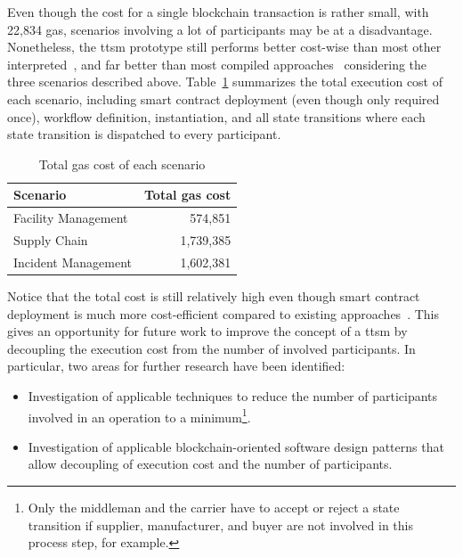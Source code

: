 Even though the cost for a single blockchain transaction is rather small, with 22,834 gas, scenarios involving a lot of participants may be at a disadvantage. Nonetheless, the \gls{ttsm} prototype still performs better cost-wise than most other interpreted~\cite{interpreted_bp_on_blockchain_loukil,interpreted_bp_on_blockchain_weber}, and far better than most compiled approaches~\cite{untrusted_bp_execution_using_blockchain,optimized_execution_of_bp_using_petri_nets_on_blockchain} considering the three scenarios described above. Table~\ref{tab:evaluation:simulations:gas_cost_total} summarizes the total execution cost of each scenario, including smart contract deployment (even though only required once), workflow definition, instantiation, and all state transitions where each state transition is dispatched to every participant.

\begin{table}[h]
\centering
\begin{tabular}{|l|r|}
    \hline
    \textbf{Scenario} & \textbf{Total gas cost} \\
    \hline
    Facility Management & 574,851 \\
    Supply Chain        & 1,739,385 \\
    Incident Management & 1,602,381 \\
    \hline
\end{tabular}
\caption{Total gas cost of each scenario}
\label{tab:evaluation:simulations:gas_cost_total}
\end{table}

Notice that the total cost is still relatively high even though smart contract deployment is much more cost-efficient compared to existing approaches~\cite{interpreted_bp_on_blockchain_loukil,interpreted_bp_on_blockchain_weber}. This gives an opportunity for future work to improve the concept of a \gls{ttsm} by decoupling the execution cost from the number of involved participants. In particular, two areas for further research have been identified:

\begin{itemize}
    \item Investigation of applicable techniques to reduce the number of participants involved in an operation to a minimum\footnote{Only the middleman and the carrier have to accept or reject a state transition if supplier, manufacturer, and buyer are not involved in this process step, for example.}.
    \item Investigation of applicable blockchain-oriented software design patterns that allow decoupling of execution cost and the number of participants.
\end{itemize}

